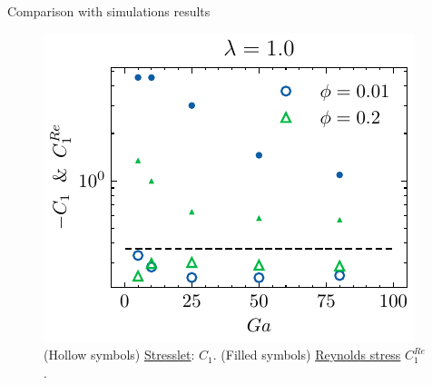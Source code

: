 \documentclass{sintefbeamer}
\begin{document}



\begin{frame}{Comparison with simulations results}
  \begin{figure}[h!]
    \centering
    \includegraphics[height = 0.25\textwidth]{image/HOMOGENEOUS_final/PA/Sdev_diapo_l_10.pdf}
    \caption{
      (Hollow symbols) \underline{Stresslet}: $C_1$. 
      (Filled symbols) \underline{Reynolds stress} $C_1^{Re}$. 
     }
\end{figure}



\end{frame}
\end{document}
